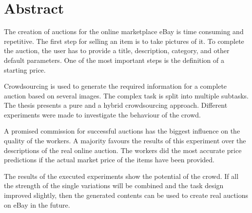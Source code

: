 \chapter*{Abstract}
\thispagestyle{empty}
The creation of auctions for the online marketplace eBay is time consuming and repetitive. The first step for selling an item is to take pictures of it. To complete the auction, the user has to provide a title, description, category, and other default parameters. One of the most important steps is the definition of a starting price.

Crowdsourcing is used to generate the required information for a complete auction based on several images. The complex task is split into multiple subtasks. The thesis presents a pure and a hybrid crowdsourcing approach. Different experiments were made to investigate the behaviour of the crowd.

A promised commission for successful auctions has the biggest influence on the quality of the workers. A majority favours the results of this experiment over the descriptions of the real online auction. The workers did the most accurate price predictions if the actual market price of the items have been provided.
  
The results of the executed experiments show the potential of the crowd. If all the strength of the single variations will be combined and the task design improved slightly, then the generated contents can be used to create real auctions on eBay in the future.
\clearpage
